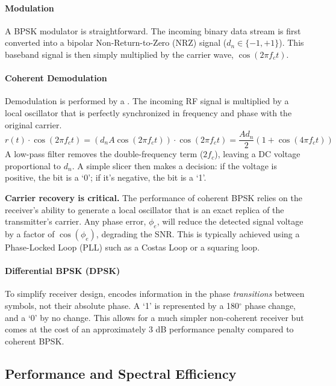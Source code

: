 \paragraph{Modulation}
A BPSK modulator is straightforward. The incoming binary data stream is first converted into a bipolar Non-Return-to-Zero (NRZ) signal ($d_n \in \{-1, +1\}$). This baseband signal is then simply multiplied by the carrier wave, $\cos(2\pi f_c t)$.

\paragraph{Coherent Demodulation}
Demodulation is performed by a . The incoming RF signal is multiplied by a local oscillator that is perfectly synchronized in frequency and phase with the original carrier.
\begin{equation}
    r(t) \cdot \cos(2\pi f_c t) = (d_n A \cos(2\pi f_c t)) \cdot \cos(2\pi f_c t) = \frac{A d_n}{2} (1 + \cos(4\pi f_c t))
\end{equation}
A low-pass filter removes the double-frequency term ($2f_c$), leaving a DC voltage proportional to $d_n$. A simple slicer then makes a decision: if the voltage is positive, the bit is a `0'; if it's negative, the bit is a `1'.

\begin{warningbox}
    \textbf{Carrier recovery is critical.} The performance of coherent BPSK relies on the receiver's ability to generate a local oscillator that is an exact replica of the transmitter's carrier. Any phase error, $\phi_e$, will reduce the detected signal voltage by a factor of $\cos(\phi_e)$, degrading the SNR. This is typically achieved using a Phase-Locked Loop (PLL) such as a Costas Loop or a squaring loop.
\end{warningbox}

\paragraph{Differential BPSK (DPSK)}
To simplify receiver design,  encodes information in the phase \emph{transitions} between symbols, not their absolute phase. A `1' is represented by a 180$^\circ$ phase change, and a `0' by no change. This allows for a much simpler non-coherent receiver but comes at the cost of an approximately 3 dB performance penalty compared to coherent BPSK.


\subsection{Performance and Spectral Efficiency}

